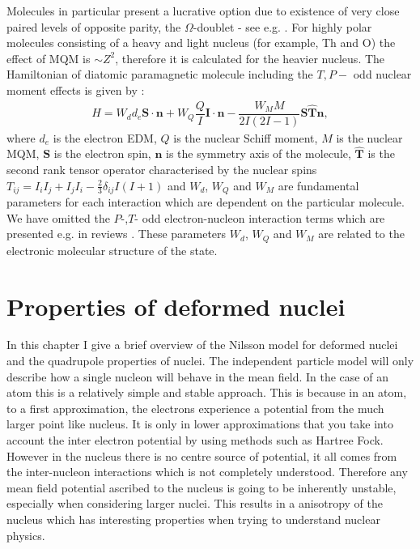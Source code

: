 \documentclass[10pt,a4paper, twoside, openright]{report}
\begin{document}
Molecules in particular present a lucrative option due to existence of very close paired levels of opposite parity, the  $\Omega$-doublet - see e.g.  \cite{Flambaum2014}. For highly polar molecules consisting of a heavy and light nucleus (for example, Th and O) the effect of MQM is $\sim Z^2$, therefore it is calculated for the heavier nucleus. The Hamiltonian of diatomic paramagnetic molecule including the $T, P-$ odd nuclear moment effects is given by \cite{SFK1984,Kozlov1995}:
\begin{align}
H = W_d d_e \mathbf{S}\cdot\mathbf{n} + W_{Q}\dfrac{Q}{I}\mathbf{I}\cdot\mathbf{n} - \dfrac{W_{M}M}{2I(2I -1)}\mathbf{S}\hat{\mathbf{T}}\mathbf{n},
\end{align}
where $d_e$ is the electron EDM, $Q$ is the nuclear Schiff moment, $M$ is the nuclear MQM, $\mathbf{S}$ is the electron spin, $\mathbf{n}$ is the symmetry axis of the molecule, $\hat{\mathbf{T}} $ is the second rank tensor operator characterised by the nuclear spins $T_{ij} = I_iI_j + I_jI_i - \tfrac{2}{3}\delta_{ij}I(I + 1)$  and  $W_d$, $W_Q$ and $W_M$ are fundamental parameters for each interaction which are dependent on the particular molecule. We have omitted the $P$-,$T$- odd electron-nucleon interaction terms which are presented e.g. in reviews \cite{Safronova2017,GF2004}. 
These parameters $W_d$, $W_Q$ and $W_M$
are related to the electronic molecular structure of the state.
\chapter{Properties of deformed nuclei} \label{chap:Deformed}
 In this chapter I give a brief overview of the Nilsson model for deformed nuclei and the quadrupole properties of nuclei. The independent particle model will only describe how a single nucleon will behave in the mean field. In the case of an atom this is a relatively simple and stable approach. This is because in an atom, to a first approximation, the electrons experience a potential from the much larger point like nucleus. It is only in lower approximations that you take into account the inter electron potential by using methods such as Hartree Fock. However in the nucleus there is no centre source of potential, it all comes from the inter-nucleon interactions which is not completely understood. Therefore any mean field potential ascribed to the nucleus is going to be inherently unstable, especially when considering larger nuclei. This results in a anisotropy of the nucleus which has interesting properties when trying to understand nuclear physics. 
\end{document}
